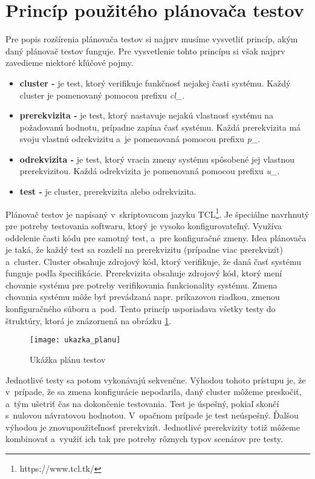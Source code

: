 \section{Princíp použitého plánovača testov} \label{sekcia:planovac}
Pre popis rozšírenia plánovača testov si najprv musíme vysvetliť princíp, akým daný plánovač testov funguje.
Pre vysvetlenie tohto princípu si však najprv zavedieme niektoré kľúčové pojmy.
\begin{itemize}
\item \textbf{cluster -} je test, ktorý verifikuje funkčnosť nejakej časti systému. Každý cluster je pomenovaný pomocou prefixu {\it cl\_}. 
\item \textbf{prerekvizita -} je test, ktorý nastavuje nejakú vlastnosť systému na požadovanú hodnotu, prípadne zapína časť systému. 
Každá prerekvizita má svoju vlastnú odrekvizitu a~je pomenovaná pomocou prefixu {\it p\_}.
\item \textbf{odrekvizita -} je test, ktorý vracia zmeny systému spôsobené jej vlastnou prerekvizitou. Každá odrekvizita je pomenovaná
pomocou prefixu {\it u\_}. 
\item \textbf{test -} je cluster, prerekvizita alebo odrekvizita.
\end{itemize}

Plánovač testov je napísaný v~skriptovacom jazyku TCL\footnote{https://www.tcl.tk/}. 
Je špeciálne navrhnutý pre potreby testovania softwaru, ktorý je vysoko konfigurovateľný. 
Využíva oddelenie časti kódu pre samotný test, a~pre konfiguračné zmeny. 
Idea plánovača je taká, že každý test sa rozdelí na prerekvizitu (prípadne viac prerekvizít) a~cluster. Cluster obsahuje zdrojový kód, ktorý verifikuje, že daná
časť systému funguje podľa špecifikácie. Prerekvizita obsahuje zdrojový kód, ktorý mení chovanie systému pre potreby verifikovania funkcionality systému.
Zmena chovania systému môže byť prevádzaná napr. príkazovou riadkou, zmenou konfiguračného súboru a~pod.
Tento princíp usporiadava všetky testy do štruktúry, ktorá je znázornená na obrázku \ref{figure:ukazka_planu}.
\begin{figure}[h]
	\begin{center}
    \texttt{[image: ukazka\_planu]}
    \caption{Ukážka plánu testov}
    \label{figure:ukazka_planu}
    \end{center}
\end{figure}

Jednotlivé testy sa potom vykonávajú sekvenčne. Výhodou tohoto prístupu je, že v~prípade, že sa zmena konfigurácie nepodarila,
daný cluster môžeme preskočiť, a~tým ušetriť čas na dokončenie testovania. 
Test je úspešný, pokiaľ skončí s~nulovou návratovou hodnotou. V~opačnom prípade je test neúspešný. 
Ďalšou výhodou je znovupoužiteľnosť prerekvizít. 
Jednotlivé prerekvizity totiž môžeme kombinovať a~využiť ich tak pre potreby rôznych typov scenárov pre testy. 

